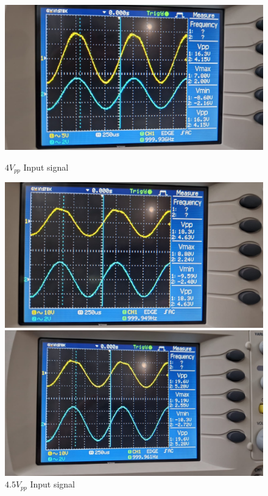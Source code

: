 \begin{figure}[h]
    \centering
    \begin{minipage}{.4\textwidth}
        \includegraphics[width=1\linewidth]{assets/p3-exp-4.png}
        \caption{$4V_{pp}$ Input signal}
        \label{fig:p3-exp-4}
    \end{minipage}%
    \begin{minipage}{.4\textwidth}
        \includegraphics[width=1\linewidth]{assets/p3-exp-4.5.png}
        \caption{$4.5V_{pp}$ Input signal}
        \label{fig:p3-exp-4.5}
    \end{minipage}
    \begin{minipage}{.4\textwidth}
        \includegraphics[width=1\linewidth]{assets/p3-exp-5.png}

\end{minipage}
\end{figure}

